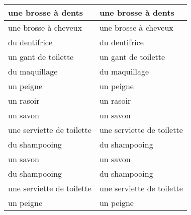 \documentclass{article}
\date{}
\newcommand{\tabrowEnd}{\rule{0pt}{35pt}\\}
\begin{document}
  \centering
  \noindent
  {\LARGE
    \begin{tabular}{| p{} | p{} |}
      \hline
      une brosse à dents        & une brosse à dents \tabrowEnd
      \hline
      une brosse à cheveux      & une brosse à cheveux \tabrowEnd
      \hline
      du dentifrice             & du dentifrice \tabrowEnd
      \hline
      un gant de toilette       & un gant de toilette \tabrowEnd
      \hline
      du maquillage             & du maquillage \tabrowEnd
      \hline
      un peigne                 & un peigne \tabrowEnd
      \hline
      un rasoir                 & un rasoir \tabrowEnd
      \hline
      un savon                  & un savon \tabrowEnd
      \hline
      une serviette de toilette & une serviette de toilette \tabrowEnd
      \hline
      du shampooing             & du shampooing \tabrowEnd
      \hline
      un savon                  & un savon \tabrowEnd
      \hline
      du shampooing             & du shampooing \tabrowEnd
      \hline
      une serviette de toilette & une serviette de toilette \tabrowEnd
      \hline
      un peigne                 & un peigne \tabrowEnd
      \hline
    \end{tabular}
  }
\end{document}
